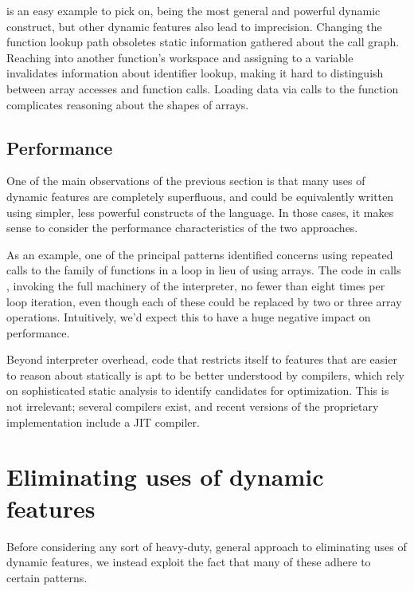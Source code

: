  is an easy example to pick on, being the most general and powerful
dynamic construct, but other dynamic features also lead to imprecision.
Changing the function lookup path obsoletes static information gathered about
the call graph. Reaching into another function's workspace and assigning to a
variable invalidates information about identifier lookup, making it hard to
distinguish between array accesses and function calls. Loading data via calls
to the  function complicates reasoning about the shapes of arrays.

\subsection{Performance}

One of the main observations of the previous section is that many uses of
dynamic features are completely superfluous, and could be equivalently written
using simpler, less powerful constructs of the language. In those cases, it
makes sense to consider the performance characteristics of the two approaches.

As an example, one of the principal patterns identified concerns using repeated
calls to the  family of functions in a loop in lieu of using arrays.
The code in  calls , invoking the full
machinery of the interpreter, no fewer than eight times per loop iteration,
even though each of these could be replaced by two or three array operations.
Intuitively, we'd expect this to have a huge negative impact on performance.

Beyond interpreter overhead, code that restricts itself to features that are
easier to reason about statically is apt to be better understood by compilers,
which rely on sophisticated static analysis to identify candidates for
optimization. This is not irrelevant; several \matlab compilers exist, and
recent versions of the proprietary \matlab implementation include a JIT
compiler. %


\section{Eliminating uses of dynamic features}

Before considering any sort of heavy-duty, general approach to eliminating
uses of dynamic features, we instead exploit the fact that many of these
adhere to certain patterns.

